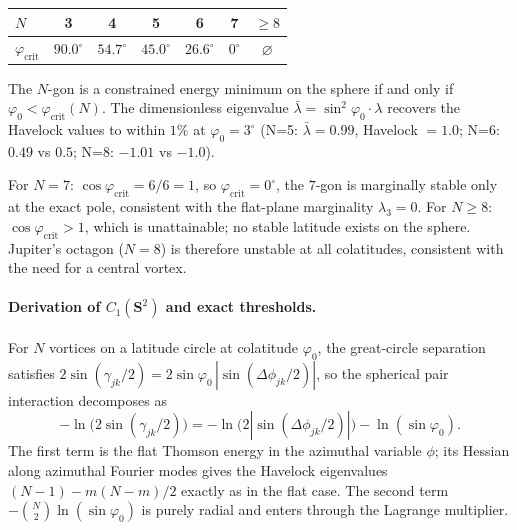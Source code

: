 \begin{center}
\begin{tabular}{lcccccc}
\toprule
$N$ & 3 & 4 & 5 & 6 & 7 & $\ge 8$ \\
\midrule
$\varphi_{\mathrm{crit}}$ & $90.0^\circ$ & $54.7^\circ$ &
  $45.0^\circ$ & $26.6^\circ$ & $0^\circ$ & $\varnothing$ \\
\bottomrule
\end{tabular}
\end{center}

\noindent
The $N$-gon is a constrained energy minimum on the sphere if and only
if $\varphi_0 < \varphi_{\mathrm{crit}}(N)$.  The dimensionless
eigenvalue $\bar\lambda = \sin^2\!\varphi_0 \cdot \lambda$ recovers
the Havelock values to within $1\%$ at $\varphi_0 = 3^\circ$
(N=5: $\bar\lambda = 0.99$, Havelock $= 1.0$;
N=6: $0.49$ vs $0.5$; N=8: $-1.01$ vs $-1.0$).

For $N = 7$: $\cos\varphi_{\mathrm{crit}} = 6/6 = 1$, so
$\varphi_{\mathrm{crit}} = 0^\circ$, the $7$-gon is marginally
stable only at the exact pole, consistent with the flat-plane
marginality $\lambda_3 = 0$.
For $N \ge 8$: $\cos\varphi_{\mathrm{crit}} > 1$, which is
unattainable; no stable latitude exists on the sphere.
Jupiter's octagon ($N = 8$) is therefore unstable at all
colatitudes, consistent with the need for a central vortex.

\paragraph{Derivation of $C_1(\mathbf{S}^2)$ and exact thresholds.}
For $N$ vortices on a latitude circle at colatitude $\varphi_0$, the
great-circle separation satisfies
$2\sin(\gamma_{jk}/2) = 2\sin\varphi_0\,|\sin(\Delta\phi_{jk}/2)|$,
so the spherical pair interaction decomposes as
\[
  -\ln\bigl(2\sin(\gamma_{jk}/2)\bigr)
  = -\ln\bigl(2|\sin(\Delta\phi_{jk}/2)|\bigr) - \ln(\sin\varphi_0).
\]
The first term is the flat Thomson energy in the azimuthal variable
$\phi$; its Hessian along azimuthal Fourier modes gives the Havelock
eigenvalues $(N{-}1) - m(N{-}m)/2$ exactly as in the flat case.
The second term $-\binom{N}{2}\ln(\sin\varphi_0)$ is purely
radial and enters through the Lagrange multiplier.

